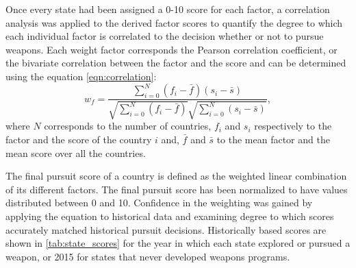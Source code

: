Once every state had been assigned a 0-10 score for each factor, a correlation
analysis was applied to the derived factor scores to quantify the degree to
which each individual factor is correlated to the decision whether or not to
pursue weapons.
Each weight factor corresponds the Pearson correlation coefficient, or
the bivariate correlation between the factor and the score and can be
determined using the equation \ref{eqn:correlation}:
\begin{equation}
    \label{eqn:correlation}
    w_{f} = \frac{\sum_{i=0}^{N} (f_{i} - \bar{f}) (s_{i} - \bar{s})}
                 {\sqrt{\sum_{i=0}^{N}\left(f_{i} - \bar{f}\right)}
                 \sqrt{\sum_{i=0}^{N}\left(s_{i} - \bar{s}\right)}},
\end{equation}
where $N$ corresponds to the number of countries, $f_{i}$ and $s_{i}$ respectively
to the factor and the score of the country $i$ and, $\bar{f}$ and $\bar{s}$ to
the mean factor and the mean score over all the countries.

The final pursuit score of a country is defined as the weighted linear combination of
its different factors. The final pursuit score has been normalized to have
values distributed between 0 and 10. Confidence in the weighting was gained by applying the equation to historical data and examining degree to which scores accurately matched historical pursuit decisions.  Historically based scores are shown in \ref{tab:state_scores} for the year in which each state explored or pursued a weapon, or 2015 for states that never developed weapons programs.


